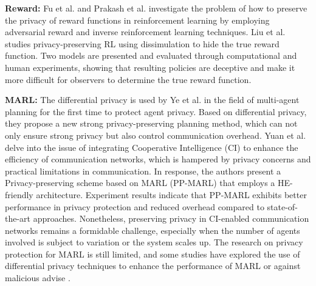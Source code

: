 \documentclass[acmsmall]{acmart}
\begin{document}
\textbf{Reward: } Fu et al. \cite{fu2017learning} and Prakash et al. \cite{Prakash_Husain_Paruchuri_Gujar_2022} investigate the problem of how to preserve the privacy of reward functions in reinforcement learning by employing adversarial reward and inverse reinforcement learning techniques.
Liu et al. \cite{liu2021deceptive} studies privacy-preserving RL using dissimulation to hide the true reward function. Two models are presented and evaluated through computational and human experiments, showing that resulting policies are deceptive and make it more difficult for observers to determine the true reward function. 

\textbf{MARL: } The differential privacy is used by Ye et al. \cite{9170873} in the field of multi-agent planning for the first time to protect agent privacy. Based on differential privacy, they propose a new strong privacy-preserving planning method, which can not only ensure strong privacy but also control communication overhead. %
Yuan et al. \cite{yuan2022pp} delve into the issue of integrating Cooperative Intelligence (CI) to enhance the efficiency of communication networks, which is hampered by privacy concerns and practical limitations in communication. In response, the authors present a Privacy-preserving scheme based on MARL (PP-MARL) that employs a HE-friendly architecture.  Experiment results indicate that PP-MARL exhibits better performance in privacy protection and reduced overhead compared to state-of-the-art approaches. Nonetheless, preserving privacy in CI-enabled communication networks remains a formidable challenge, especially when the number of agents involved is subject to variation or the system scales up. The research on privacy protection for MARL is still limited, and some studies have explored the use of differential privacy techniques to enhance the performance of MARL \cite{9269516,cheng2022multi} or against malicious advise \cite{8685696}.
\end{document}
